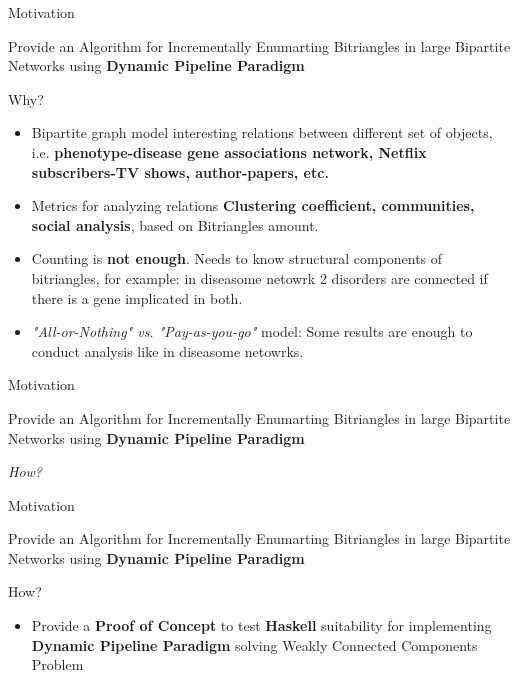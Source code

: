 \begin{frame}[fragile]{Motivation}
  \begin{center}
    Provide an Algorithm for Incrementally Enumarting Bitriangles in large Bipartite Networks using \textbf{Dynamic Pipeline Paradigm}
  \end{center}    
  \begin{block}{Why?}
    \begin{itemize}
      \item {\color{light}Bipartite graph model interesting relations between different set of objects, i.e. \textbf{phenotype-disease gene associations network, Netflix subscribers-TV shows, author-papers, etc.}}
      \item {\color{light}Metrics for analyzing relations \textbf{Clustering coefficient, communities, social analysis}, based on Bitriangles amount.}
      \item {\color{light}Counting is \textbf{not enough}. Needs to know structural components of bitriangles, for example: in diseasome netowrk 2 disorders are connected if there is a gene implicated in both.}
      \item \emph{"All-or-Nothing" vs. "Pay-as-you-go"} model: Some results are enough to conduct analysis like in diseasome netowrks. 
    \end{itemize}
  \end{block}
\end{frame}

\begin{frame}[fragile]{Motivation}
  \begin{center}
    Provide an Algorithm for Incrementally Enumarting Bitriangles in large Bipartite Networks using \textbf{Dynamic Pipeline Paradigm}
  \end{center}    
  \vspace{0.5cm}
  \begin{center}
    \huge\emph{How?}
  \end{center}  
\end{frame}

\begin{frame}[fragile]{Motivation}
  \begin{center}
    Provide an Algorithm for Incrementally Enumarting Bitriangles in large Bipartite Networks using \textbf{Dynamic Pipeline Paradigm}
  \end{center}    
  \begin{block}{How?}
    \begin{itemize}
      \item Provide a \textbf{Proof of Concept} to test \textbf{Haskell} suitability for implementing  \textbf{Dynamic Pipeline Paradigm} solving Weakly Connected Components Problem
  \end{itemize}   
\end{block} 
\end{frame}

